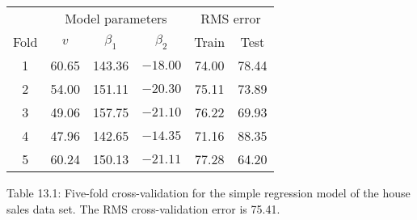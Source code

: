 \begin{table}
\begin{tabular}{c c c c c c} \hline \hline  & \multicolumn{3}{c}{Model parameters} & \multicolumn{2}{c}{RMS error} \\ \cline{2-6} Fold & \(v\) & \(\beta_{1}\) & \(\beta_{2}\) & Train & Test \\ \hline
1 & 60.65 & 143.36 & \(-18.00\) & 74.00 & 78.44 \\
2 & 54.00 & 151.11 & \(-20.30\) & 75.11 & 73.89 \\
3 & 49.06 & 157.75 & \(-21.10\) & 76.22 & 69.93 \\
4 & 47.96 & 142.65 & \(-14.35\) & 71.16 & 88.35 \\
5 & 60.24 & 150.13 & \(-21.11\) & 77.28 & 64.20 \\ \hline \hline \end{tabular}
\end{table}
Table 13.1: Five-fold cross-validation for the simple regression model of the house sales data set. The RMS cross-validation error is 75.41.

 